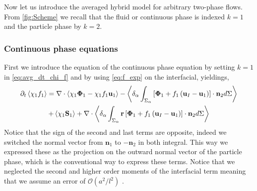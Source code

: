 
Now let us introduce the averaged hybrid model for arbitrary two-phase flows. 
From \ref{fig:Scheme} we recall that the fluid or continuous phase is indexed $k=1$ and the particle phase by $k=2$.  

\subsubsection*{Continuous phase equations}
First we introduce the equation of the continuous phase equation by setting $k = 1$ in \ref{eq:avg_dt_chi_f} and by using \ref{eq:f_exp} on the interfacial, yieldings,
\begin{multline}
    \partial_t \left<\chi_1 f_1\right>
    = \mathbf{\nabla} \cdot \left<\chi_1 \mathbf{\Phi}_1 - \chi_1 f_1 \textbf{u}_1\right>
    - \left<\delta_\alpha \int_{\Sigma_\alpha}\left[
        \mathbf{\Phi}_1  
        + f_1
        \left(
            \textbf{u}_I
            - \textbf{u}_1
        \right)
    \right]
    \cdot \textbf{n}_2d\Sigma\right> \\
    + \left<\chi_1 \textbf{S}_1\right>
    +  \mathbf{\nabla} \cdot \left<\delta_\alpha \int_{\Sigma_\alpha} \textbf{r}\left[
        \mathbf{\Phi}_1
        + f_1
        \left(
            \textbf{u}_I
            - \textbf{u}_1
        \right)
    \right]
    \cdot \textbf{n}_2d\Sigma\right> 
    \label{eq:hybrid_avg_dt_chif}
\end{multline}
Notice that the sign of the second and last terms are opposite, indeed we switched the normal vector from $\textbf{n}_1$ to $-\textbf{n}_2$ in both integral. 
This way we expressed these as the projection on the outward normal vector of the particle phase, which is the conventional way to express these terms. 
Notice that we neglected the second and higher order moments of the interfacial term meaning that we assume an error of $\mathcal{O}\left(a^2/l^2\right)$ \citep{jackson1997locally}. 


